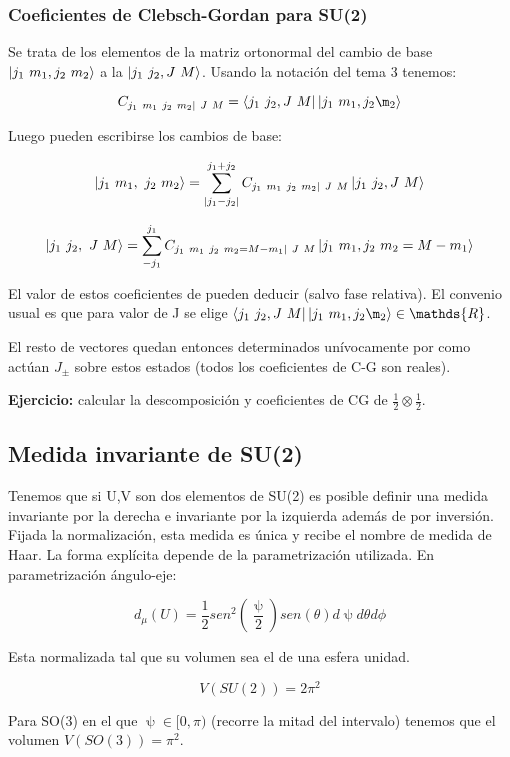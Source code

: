 \subsubsection{Coeficientes de Clebsch-Gordan para SU(2)}

Se trata de los elementos de la matriz ortonormal del cambio de base $\ket{j_1 \ m_1,j_2 \ m_2}$ a la $\ket{j_1 \ j_2, J \ M}$. Usando la notación del tema 3 tenemos:

$$C_{j_1 \ m_1 \ j_2 \ m_2 | \ J \ M}=\bra{j_1 \ j_2 , J \ M}\ket{j_1 \ m_1, j_2 \m_2}$$

Luego pueden escribirse los cambios de base:

$$\ket{j_1 \ m_1, \ j_2 \ m_2}=\sum _{|j_1-j_2|}^{j_1+j_2} C_{j_1 \ m_1 \ j_2 \ m_2 | \ J \ M} \ket{j_1 \ j_2 , J \ M}$$

$$\ket{j_1 \ j_2, \ J \ M}=\sum _{-j_1}^{j_1} C_{j_1 \ m_1 \ j_2 \ m_2=M-m_1 | \ J \ M} \ket{j_1 \ m_1 , j_2 \ m_2=M-m_1}$$

El valor de estos coeficientes de pueden deducir (salvo fase relativa). El convenio usual es que para valor de J se elige $\bra{j_1 \ j_2 , J \ M}\ket{j_1 \ m_1, j_2 \m_2} \in \mathds{R}$.

El resto de vectores quedan entonces determinados unívocamente por como actúan $J_\pm$ sobre estos estados (todos los coeficientes de C-G son reales).

\textbf{Ejercicio:} calcular la descomposición y coeficientes de CG de $\frac{1}{2}\otimes \frac{1}{2}$.

\subsection{Medida invariante de SU(2)}

Tenemos que si U,V son dos elementos de SU(2) es posible definir una medida invariante por la derecha e invariante por la izquierda además de por inversión. Fijada la normalización, esta medida es única y recibe el nombre de medida de Haar. La forma explícita depende de la parametrización utilizada. En parametrización ángulo-eje:

$$d_\mu (U)=\frac{1}{2}sen^2(\frac{\uppsi}{2})sen(\theta) d\uppsi d\theta d\phi$$

Esta normalizada tal que su volumen sea el de una esfera unidad.

$$V(SU(2))=2\pi ^2$$

Para SO(3) en el que $\uppsi \in [0,\pi )$ (recorre la mitad del intervalo) tenemos que el volumen $V(SO(3))=\pi ^2$.

